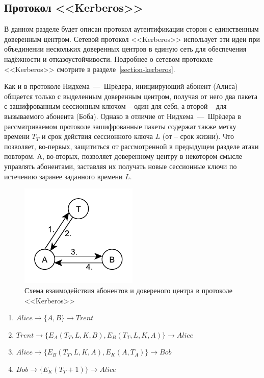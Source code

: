 \subsection{Протокол <<Kerberos>>}

В данном разделе будет описан протокол аутентификации сторон с единственным доверенным центром. Сетевой протокол <<Kerberos>> использует эти идеи при объединении нескольких доверенных центров в единую сеть для обеспечения надёжности и отказоустойчивости. Подробнее о сетевом протоколе <<Kerberos>> смотрите в разделе~\ref{section-kerberos}.

Как и в протоколе Нидхема~---~Шрёдера, инициирующий абонент (Алиса) общается только с выделенным доверенным центром, получая от него два пакета с зашифрованным сессионным ключом -- один для себя, а второй -- для вызываемого абонента (Боба). Однако в отличие от Нидхема~---~Шрёдера в рассматриваемом протоколе зашифрованные пакеты содержат также метку времени $T_T$ и срок действия сессионного ключа $L$ (от  -- срок жизни). Что позволяет, во-первых, защититься от рассмотренной в предыдущем разделе атаки повтором. А, во-вторых, позволяет доверенному центру в некотором смысле управлять абонентами, заставляя их получать новые сессионные ключи по истечению заранее заданного времени $L$.

\begin{figure}[!htb]
    \centering
    \includegraphics[width=0.5\textwidth]{pic/key_distribution-kerberos}
    \caption{Схема взаимодействия абонентов и довереного центра в протоколе <<Kerberos>>\label{fig:key_distribution-kerberos}}
\end{figure}

\begin{enumerate}
	\item $ Alice	\rightarrow \{ A, B \}									\rightarrow Trent $
	\item $ Trent	\rightarrow \{ E_A \left( T_T, L, K, B \right), E_B \left( T_T, L, K, A \right) \}	\rightarrow Alice $
	\item $ Alice	\rightarrow \{ E_B \left( T_T, L, K, A \right), E_K \left( A, T_A \right) \}		\rightarrow Bob $
	\item $ Bob	\rightarrow \{ E_K \left( T_T + 1 \right) \}						\rightarrow Alice $
\end{enumerate}

